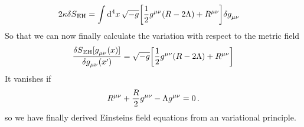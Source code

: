 \begin{equation}
\begin{split}
2\kappa\delta S\textsubscript{EH}
&=\fourint \sqrt{-g}\left[
\frac{1}{2}\tensor{g}{^\mu^\nu}
(R-2\Lambda)+\tensor{R}{^\mu^\nu}\right]\delta\tensor{g}{_\mu_\nu}
\end{split}
\end{equation}
So that we can now finally calculate the variation with respect to the metric
field
\begin{equation}
\frac{\delta
S\textsubscript{EH}[\tensor{g}{_\mu_\nu}(x)]}{\delta\tensor{g}{_\mu_\nu}(x')}
=\sqrt{-g}\left[\frac{1}{2}\tensor{g}{^\mu^\nu}
(R-2\Lambda)+\tensor{R}{^\mu^\nu}\right]
\end{equation}
It vanishes if 
\begin{equation}
\tensor{R}{^\mu^\nu}+\frac{R}{2}\tensor{g}{^\mu^\nu}
-\Lambda\tensor{g}{^\mu^\nu}=0\, .
\end{equation}
so we have finally derived Einsteins field equations from an variational
principle.
